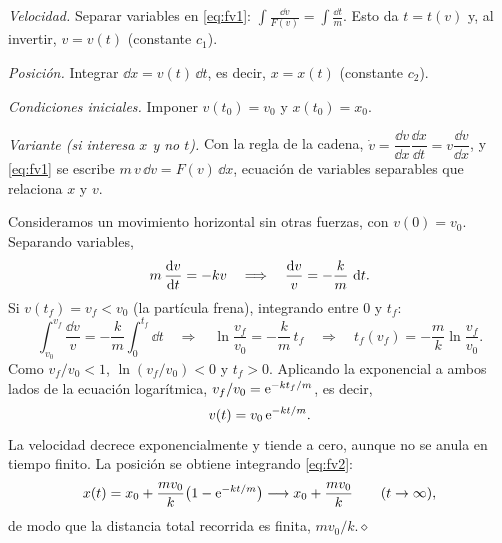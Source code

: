 \documentclass[11pt,twoside]{article}
\newcommand\fin{\hfill\textcolor{muted}{$\diamond$}}
\begin{document}
\begin{algoritmo}[movimiento con $F=F(v)$]
\begin{pasosalg}
\item \emph{Velocidad.} Separar variables en \eqref{eq:fv1}: $\displaystyle\int\frac{\dd v}{F(v)}=\int\frac{\dd t}{m}$. Esto da
$t=t(v)$ y, al invertir, $v=v(t)$ (constante $c_1$).
\item \emph{Posición.} Integrar $\dd x=v(t)\,\dd t$, es decir, $x=x(t)$ (constante $c_2$).
\item \emph{Condiciones iniciales.} Imponer $v(t_0)=v_0$ y $x(t_0)=x_0$.
\item \emph{Variante (si interesa $x$ y no $t$).} Con la regla de la cadena, $\dot v=\dfrac{\dd v}{\dd x}\dfrac{\dd x}{\dd t}=v\dfrac{\dd v}{\dd x}$,
y \eqref{eq:fv1} se escribe $m\,v\,\dd v=F(v)\,\dd x$, ecuación de variables separables que relaciona $x$ y $v$.
\end{pasosalg}
\end{algoritmo}

\begin{ejemplo}[arrastre lineal, $F(v)=-kv$]
Consideramos un movimiento horizontal sin otras fuerzas, con $v(0)=v_0$. Separando variables,
\begin{equation*}
m\,\frac{\mathrm{d}v}{\mathrm{d}t}=-kv\quad\Longrightarrow\quad\frac{\mathop{}\!\mathrm{d} v}{v}=-\frac km\,\mathop{}\!\mathrm{d} t.
\end{equation*}
Si $v(t_f)=v_f<v_0$ (la partícula frena), integrando entre $0$ y $t_f$:
\begin{equation*}
\int_{v_0}^{v_f}\frac{\dd v}{v}=-\frac km\int_0^{t_f}\dd t\quad\Longrightarrow\quad\ln\frac{v_f}{v_0}=-\frac km\,t_f
\quad\Longrightarrow\quad t_f(v_f)=-\frac mk\ln\frac{v_f}{v_0}.
\end{equation*}
Como $v_f/v_0<1$, $\ln(v_f/v_0)<0$ y $t_f>0$. Aplicando la exponencial a ambos lados de la ecuación logarítmica,
$v_f/v_0=\mathrm{e}^{-kt_f/m}$, es decir,
\begin{equation}\label{eq:arrastrelin}
v(t)=v_0\,\mathrm{e}^{-kt/m}.
\end{equation}
La velocidad decrece exponencialmente y tiende a cero, aunque no se anula en tiempo finito. La posición se obtiene
integrando \eqref{eq:fv2}:
\begin{equation*}
x(t)=x_0+\frac{mv_0}{k}\big(1-\mathrm{e}^{-kt/m}\big)\longrightarrow x_0+\frac{mv_0}{k}\qquad(t\to\infty),
\end{equation*}
de modo que la distancia total recorrida es finita, $mv_0/k$.\fin
\end{ejemplo}
\end{document}
